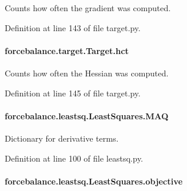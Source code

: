 Counts how often the gradient was computed. 



Definition at line 143 of file target.\-py.

\hypertarget{classforcebalance_1_1target_1_1Target_a5b5a42f78052b47f29ed4b940c6111a1}{
\paragraph[{hct}]{\setlength{\rightskip}{0pt plus 5cm}forcebalance.\-target.\-Target.\-hct\hspace{0.3cm}{\ttfamily [inherited]}}}\label{classforcebalance_1_1target_1_1Target_a5b5a42f78052b47f29ed4b940c6111a1}


Counts how often the Hessian was computed. 



Definition at line 145 of file target.\-py.

\hypertarget{classforcebalance_1_1leastsq_1_1LeastSquares_a7f08641f45285414b080f21ed278f31e}{
\paragraph[{M\-A\-Q}]{\setlength{\rightskip}{0pt plus 5cm}forcebalance.\-leastsq.\-Least\-Squares.\-M\-A\-Q}}\label{classforcebalance_1_1leastsq_1_1LeastSquares_a7f08641f45285414b080f21ed278f31e}


Dictionary for derivative terms. 



Definition at line 100 of file leastsq.\-py.

\hypertarget{classforcebalance_1_1leastsq_1_1LeastSquares_a169fd8ca94e8f36539ec4ccfa0af4902}{
\paragraph[{objective}]{\setlength{\rightskip}{0pt plus 5cm}forcebalance.\-leastsq.\-Least\-Squares.\-objective}}\label{classforcebalance_1_1leastsq_1_1LeastSquares_a169fd8ca94e8f36539ec4ccfa0af4902}


